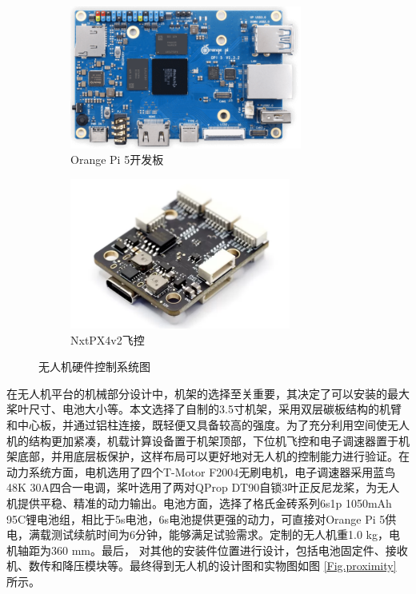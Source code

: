 \documentclass[lang=chs, degree=master, blindreview=false, winfonts=true]{yanputhesis}
\begin{document}
\begin{figure}[htb!]
    \centering
    \begin{minipage}[t]{0.96\textwidth}
        \centering
        \begin{subfigure}[t]{0.47\textwidth}
            \centering
            \includegraphics[height = 1.85in]{picture/5_5.png}
            \caption{Orange Pi 5开发板\label{fig.fmtpath}}
        \end{subfigure}\hfill
        \begin{subfigure}[t]{0.47\textwidth}
            \centering
            \includegraphics[height = 1.95in]{picture/5_6.png}
            \caption{NxtPX4v2飞控\label{fig.proximity-tra}}
        \end{subfigure}
    \end{minipage}
    \caption{无人机硬件控制系统图}
\end{figure} 
在无人机平台的机械部分设计中，机架的选择至关重要，其决定了可以安装的最大桨叶尺寸、电池大小等。本文选择了自制的3.5寸机架，采用双层碳板结构的机臂和中心板，并通过铝柱连接，既轻便又具备较高的强度。为了充分利用空间使无人机的结构更加紧凑，机载计算设备置于机架顶部，下位机飞控和电子调速器置于机架底部，并用底层板保护，这样布局可以更好地对无人机的控制能力进行验证。在动力系统方面，电机选用了四个T-Motor F2004无刷电机，电子调速器采用蓝鸟48K 30A四合一电调，桨叶选用了两对QProp DT90自锁3叶正反尼龙桨，为无人机提供平稳、精准的动力输出。电池方面，选择了格氏金砖系列6s1p 1050mAh 95C锂电池组，相比于5s电池，6s电池提供更强的动力，可直接对Orange Pi 5供电，满载测试续航时间为6分钟，能够满足试验需求。定制的无人机重1.0 kg，电机轴距为360 mm。最后， 对其他的安装件位置进行设计，包括电池固定件、接收机、数传和降压模块等。最终得到无人机的设计图和实物图如图 \ref{Fig.proximity} 所示。
\end{document}
